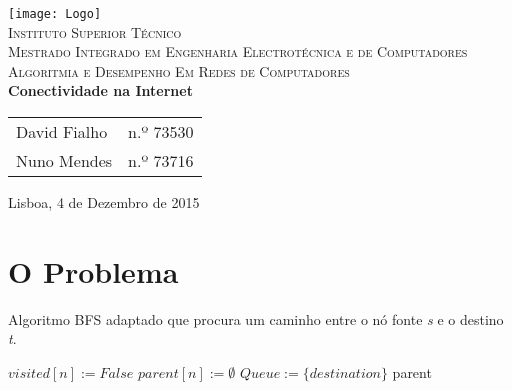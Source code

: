 \documentclass[12pt,a4paper]{scrartcl}
\begin{document}
\everymath{\displaystyle}
\setcounter{page}{1}

\begin{titlepage}
	\begin{center}
		\hfill \break
		\hfill \break
		\texttt{[image: Logo]}~\\[1cm]
		\textsc{\LARGE Instituto Superior Técnico}\\[0.25cm]
		\textsc{\Large Mestrado Integrado em Engenharia Electrotécnica e de Computadores}\\[1.8cm]
		\textsc{\huge Algoritmia e Desempenho Em Redes de Computadores}\\[0.25cm]
		{\huge \bfseries  Conectividade na Internet\\[1cm]}
		\begin{tabular}{ l l }
			David Fialho & \hspace{2mm} n.º 73530 \\
			Nuno Mendes & \hspace{2mm} n.º 73716 
		\end{tabular}
		\vfill
		{\large Lisboa, 4 de Dezembro de 2015}
	\end{center}
\end{titlepage}

\pagebreak

\section{O Problema}



\begin{algorithm}
\caption{Algoritmo BFS adaptado que procura um caminho entre o nó fonte \textit{s} e o destino \textit{t}.}\label{alg:bfs_goal}
\begin{algorithmic}[1]
    	\State $visited[n] := False $
    	\State $parent[n] := \emptyset $
    \EndFor
    \State $Queue :=  \{destination\}$
      		\Return parent 
      \EndIf
        \EndIf
      \EndFor
  	\EndWhile
\EndProcedure
\end{algorithmic}
\end{algorithm}
\end{document}

